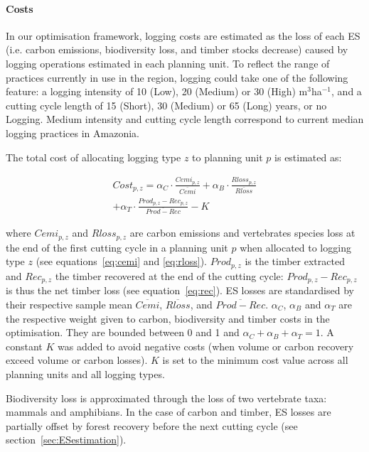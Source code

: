 \documentclass{article}
\begin{document}
\paragraph{Costs}

In our optimisation framework, logging costs are estimated as the loss of each ES (i.e. carbon emissions, biodiversity loss, and timber stocks decrease) caused by logging operations estimated in each planning unit.
To reflect the range of practices currently in use in the region, logging could take one of the following feature: a logging intensity of 10 (Low), 20 (Medium) or 30 (High) m$^3$ha$^{−1}$, and a cutting cycle length of 15 (Short), 30 (Medium) or 65 (Long) years, or no Logging. Medium intensity and cutting cycle length correspond to current median logging practices in Amazonia. 

The total cost of allocating logging type $z$ to planning unit $p$ is estimated as: 

\begin{equation}
\begin{split}
    Cost_{p,z} = \alpha _C \cdot \frac{Cemi_{p,z}}{\overline{Cemi} } + \alpha _B \cdot \frac{Rloss_{p,z}}{\overline{Rloss}} \\
    + \alpha _T \cdot \frac{Prod_{p,z} - Rec_{p,z}}{\overline{Prod - Rec}}  - K
    \end{split}
\end{equation}

where $Cemi_{p,z}$ and $Rloss_{p,z}$ are carbon emissions and vertebrates species loss at the end of the first cutting cycle in a planning unit $p$ when allocated to logging type $z$ (see equations~\ref{eq:cemi} and \ref{eq:rloss}). $Prod_{p,z}$ is the timber extracted and $Rec_{p,z}$ the timber recovered at the end of the cutting cycle: $Prod_{p,z} - Rec_{p,z}$ is thus the net timber loss (see equation~\ref{eq:rec}). 
ES losses are standardised by their respective sample mean $\overline{Cemi}$, $\overline{Rloss}$, and $\overline{Prod-Rec}$. 
$\alpha_C$, $\alpha_B$ and $\alpha_T$ are the respective weight given to carbon, biodiversity and timber costs in the optimisation. They are bounded between 0 and 1 and $\alpha_C+\alpha_B+\alpha_T = 1$. 
A constant $K$ was added to avoid negative costs (when volume or carbon recovery exceed volume or carbon losses). $K$ is set to the minimum cost value across all planning units and all logging types. 

Biodiversity loss is approximated through the loss of two vertebrate taxa: mammals and amphibians. In the case of carbon and timber, ES losses are partially offset by forest recovery before the next cutting cycle (see section~\ref{sec:ESestimation}). 
\end{document}

